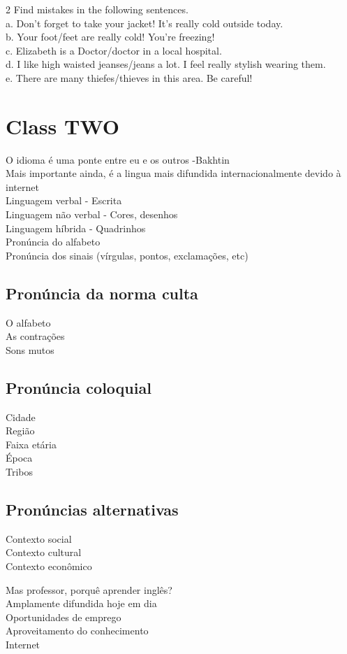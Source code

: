 \documentclass[12pt,a4paper]{article} %
\begin{document}
		2 Find mistakes in the following sentences.\\
			a. Don't forget to take your jacket! It's really cold outside today.\\
			b. Your foot/feet are really cold! You're freezing!\\
			c. Elizabeth is a Doctor/doctor in a local hospital.\\
			d. I like high waisted jeanses/jeans a lot. I feel really stylish wearing them.\\
			e. There are many thiefes/thieves in this area. Be careful!\\
\section{Class TWO}
O idioma é uma ponte entre eu e os outros -Bakhtin\\
Mais importante ainda, é a lingua mais difundida internacionalmente devido à internet\\
Linguagem verbal - Escrita\\
Linguagem não verbal - Cores, desenhos\\
Linguagem híbrida - Quadrinhos\\
Pronúncia do alfabeto\\
Pronúncia dos sinais (vírgulas, pontos, exclamações, etc)

\subsection{Pronúncia da norma culta}
O alfabeto\\
As contrações\\
Sons mutos

\subsection{Pronúncia coloquial}
Cidade\\
Região\\
Faixa etária\\
Época\\
Tribos

\subsection{Pronúncias alternativas}
Contexto social\\
Contexto cultural\\
Contexto econômico

Mas professor, porquê aprender inglês?\\
Amplamente difundida hoje em dia\\
Oportunidades de emprego\\
Aproveitamento do conhecimento\\
Internet
\end{document}
